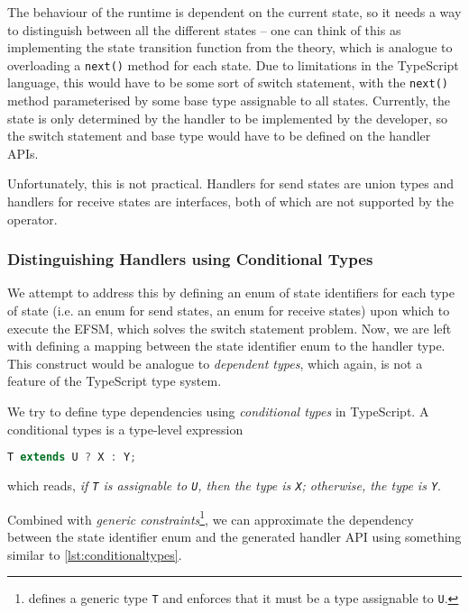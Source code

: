 The behaviour of the runtime is dependent on the current state,
so it needs a way to distinguish between
all the different states -- one can think of this as implementing
the state transition function from the theory, which is analogue to 
overloading a \texttt{next()} method for each state.
Due to limitations in the TypeScript language, this would have to
be some sort of switch statement, with the \texttt{next()}
method parameterised by some base type assignable to all states.
Currently, the state is only determined by the handler
to be implemented by the developer, so the switch statement
and base type would have to be defined on the handler APIs.

Unfortunately, this is not practical. 
Handlers for send states are union types and
handlers for receive states are interfaces,
both of which are not supported 
by the 
operator.

\subsubsection{Distinguishing Handlers using Conditional Types}
\label{subsubsection:dependenttypes}

We attempt to address this by defining an enum of state identifiers
for each type of state (i.e. an enum for send states, 
an enum for receive states)
upon which to execute the EFSM, which solves the switch statement
problem.
Now, we are left with defining a mapping between the 
state identifier enum to the handler type. This construct would be
analogue to \textit{dependent types}, which again, is not a feature
of the TypeScript type system.

We try to define type dependencies using
\textit{conditional types} in TypeScript.
A conditional types is a type-level expression
\begin{lstlisting}[language=javascript,numbers=none]
T extends U ? X : Y;
\end{lstlisting}
which reads, \textit{if \texttt{T} is assignable to \texttt{U},
then the type is \texttt{X}; otherwise, the type is \texttt{Y}}.

Combined with \textit{generic constraints}\footnote{
 defines a generic type \texttt{T}
and enforces that it must be a type assignable to \texttt{U}.
},
we can approximate the dependency between the state identifier
enum and the generated handler API using something
similar to \cref{lst:conditionaltypes}.

